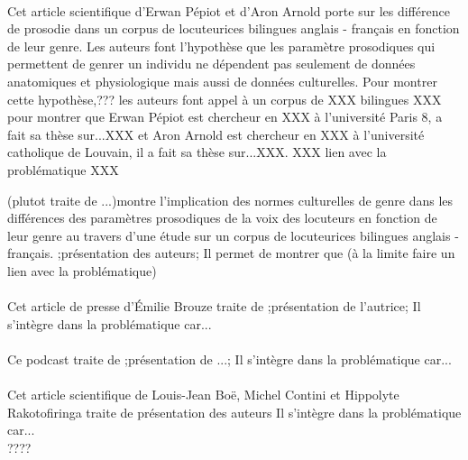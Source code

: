 \cite{Pep20} \\
      Cet article scientifique d'Erwan Pépiot et d'Aron Arnold porte sur les différence de prosodie dans un corpus de locuteurices bilingues anglais - français en fonction de leur genre. Les auteurs font l'hypothèse que les paramètre prosodiques qui permettent de genrer un individu ne dépendent pas seulement de données anatomiques et physiologique mais aussi de données culturelles. Pour montrer cette hypothèse,??? les auteurs font appel à un corpus de XXX bilingues XXX pour montrer que 
      Erwan Pépiot est chercheur en XXX à l'université Paris 8, a fait sa thèse sur...XXX et Aron Arnold est chercheur en XXX à l'université catholique de Louvain, il a fait sa thèse sur...XXX.
      XXX lien avec la problématique XXX


      (plutot traite de ...)montre l'implication des normes culturelles de genre dans les différences des paramètres prosodiques de la voix des locuteurs en fonction de leur genre au travers d'une étude sur un corpus de locuteurices bilingues anglais - français.
      ;présentation des auteurs;
      Il permet de montrer que (à la limite faire un lien avec la problématique)\\

\cite{Bro18} \\
      Cet article de presse d'Émilie Brouze traite de 
      ;présentation de l'autrice;
      Il s'intègre dans la problématique car...\\

\cite{podcast} \\
      Ce podcast traite de 
      ;présentation de ...;
      Il s'intègre dans la problématique car...\\


\cite{Boe75} \\
      Cet article scientifique de Louis-Jean Boë, Michel Contini et Hippolyte Rakotofiringa traite de 
      présentation des auteurs
      Il s'intègre dans la problématique car...\\

\cite{Lek16} ????

\cite{Pep16}

\cite{}
      
\printbibliography
